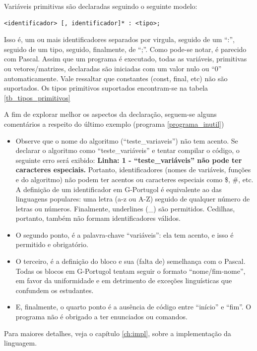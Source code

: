 \documentclass[a4paper,11pt]{report}
\begin{document}
Variáveis primitivas são declaradas seguindo o seguinte modelo:

\begin{verbatim}
<identificador> [, identificador]* : <tipo>;
\end{verbatim}

Isso é, um ou mais identificadores separados por virgula, seguido de um ``:'',
seguido de um tipo, seguido, finalmente, de ``;''. Como pode-se notar, é
parecido com Pascal. Assim que um programa é executado, todas as variáveis,
primitivas ou vetores/matrizes, declaradas são iniciadas com um valor nulo ou
``0'' automaticamente. Vale ressaltar que constantes (const, final, etc) não são
suportados. Os tipos primitivos suportados encontram-se na tabela
\ref{tb_tipos_primitivos}

A fim de explorar melhor os aspectos da declaração, seguem-se alguns comentários
a respeito do último exemplo (programa \ref{programa_inutil})

\begin{itemize}
  \item Observe que o nome do algoritmo (``teste\_variaveis'') não tem acento.
    Se declarar o algoritmo como ``teste\_variáveis'' e tentar compilar o
    código, o seguinte erro será exibido: \textbf{Linha: 1 -
      ``teste\_variáveis'' não pode ter caracteres especiais.} Portanto,
      identificadores (nomes de variáveis, funções e do algoritmo) não podem ter
      acentos ou caracteres especiais como \$, \#, etc. A definição de um
      identificador em G-Portugol é equivalente ao das linguagens populares: uma
      letra (a-z ou A-Z) seguido de qualquer número de letras ou números.
      Finalmente, underlines (\_) são permitidos. Cedilhas, portanto, também não
      formam identificadores válidos.
  \item O segundo ponto, é a palavra-chave ``variáveis'': ela tem acento, e isso
    é permitido e obrigatório.
  \item O terceiro, é a definição do bloco e sua (falta de) semelhança com o
    Pascal. Todas os blocos em G-Portugol tentam seguir o formato
    ``nome/fim-nome'', em favor da uniformidade e em detrimento de exceções
    linguísticas que confundem os estudantes.
  \item E, finalmente, o quarto ponto é a ausência de código entre ``início'' e
    ``fim''. O programa não é obrigado a ter enunciados ou comandos.
\end{itemize}

Para maiores detalhes, veja o capítulo
\ref{ch:impl}, sobre a
implementação da linguagem.
\end{document}

